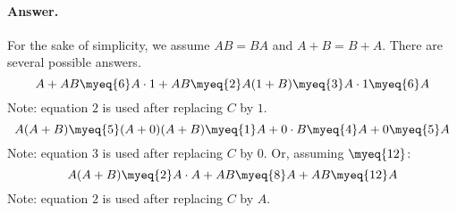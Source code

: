 \paragraph{Answer.} For the sake of simplicity, we assume \(AB
= BA\) and \(A+B=B+A\). There are several possible answers.
\[
A + AB \myeq{6} A \cdot 1 + AB \myeq{2} A(1 + B) \myeq{3} A \cdot 1
\myeq{6} A
\]
\noindent Note: equation \(2\) is used after replacing \(C\) by \(1\).
\[
A(A+B) \myeq{5} (A + 0)(A+B) \myeq{1} A + 0 \cdot B \myeq{4} A + 0 \myeq{5} A
\]
\noindent Note: equation \(3\) is used after replacing \(C\) by \(0\). Or,
assuming \(\myeq{12}\):
\[
A(A+B) \myeq{2} A \cdot A + AB \myeq{8} A + AB \myeq{12} A
\]
\noindent Note: equation \(2\) is used after replacing \(C\) by \(A\).
